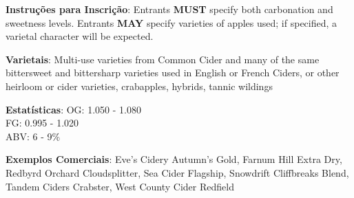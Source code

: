 \textbf{Instruções para Inscrição}: Entrants \textbf{MUST} specify both carbonation and sweetness levels. Entrants \textbf{MAY} specify varieties of apples used; if specified, a varietal character will be expected.

\textbf{Varietais}: Multi-use varieties from Common Cider and many of the same bittersweet and bittersharp varieties used in English or French Ciders, or other heirloom or cider varieties, crabapples, hybrids, tannic wildings

\textbf{Estatísticas}: OG: 1.050 - 1.080 \\
\phantom{ } \hspace{16.5mm} FG: 0.995 - 1.020 \\
\phantom{ } \hspace{16.5mm} ABV: 6 - 9\%

\textbf{Exemplos Comerciais}: Eve's Cidery Autumn's Gold, Farnum Hill Extra Dry, Redbyrd Orchard Cloudsplitter, Sea Cider Flagship, Snowdrift Cliffbreaks Blend, Tandem Ciders Crabster, West County Cider Redfield
